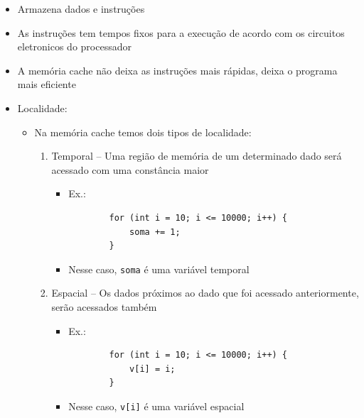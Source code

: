 \documentclass[12pt]{article}
\begin{document}
\begin{itemize}
    \item Armazena dados e instruções
    \item As instruções tem tempos fixos para a execução de acordo com os 
    circuitos eletronicos do processador
    \item A memória cache não deixa as instruções mais rápidas, deixa o programa 
    mais eficiente
    \item Localidade: 
    \begin{itemize}
        \item Na memória cache temos dois tipos de localidade:
        \begin{enumerate}
            \item Temporal -- Uma região de memória de um determinado dado será 
            acessado com uma constância maior
            \begin{itemize}
                \item Ex.: 
                \begin{verbatim}
        for (int i = 10; i <= 10000; i++) {
            soma += 1;
        }\end{verbatim}
                \item Nesse caso, \verb|soma| é uma variável temporal
            \end{itemize}
            
            \item Espacial -- Os dados próximos ao dado que foi acessado 
            anteriormente, serão acessados também
            \begin{itemize}
                \item Ex.: 
                \begin{verbatim}
        for (int i = 10; i <= 10000; i++) {
            v[i] = i;
        }\end{verbatim}
                \item Nesse caso, \verb|v[i]| é uma variável espacial
            \end{itemize}
            

\end{enumerate}
\end{itemize}
\end{itemize}
\end{document}
